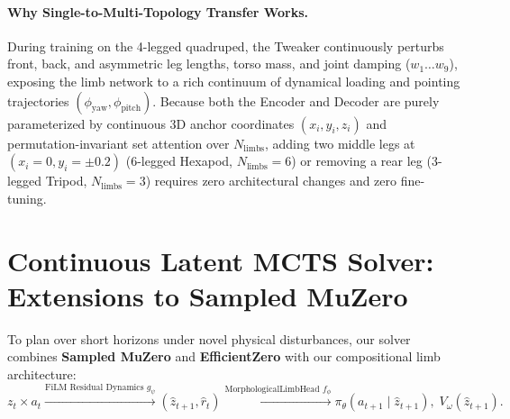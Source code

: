 \documentclass[11pt,a4paper]{article}
\begin{document}
\paragraph{Why Single-to-Multi-Topology Transfer Works.}
During training on the 4-legged quadruped, the Tweaker continuously perturbs front, back, and asymmetric leg lengths, torso mass, and joint damping ($w_1 \dots w_9$), exposing the limb network to a rich continuum of dynamical loading and pointing trajectories $(\phi_{\text{yaw}}, \phi_{\text{pitch}})$. Because both the Encoder and Decoder are purely parameterized by continuous 3D anchor coordinates $(x_i, y_i, z_i)$ and permutation-invariant set attention over $N_{\text{limbs}}$, adding two middle legs at $(x_i = 0, y_i = \pm 0.2)$ (6-legged Hexapod, $N_{\text{limbs}}=6$) or removing a rear leg (3-legged Tripod, $N_{\text{limbs}}=3$) requires zero architectural changes and zero fine-tuning.

\section{Continuous Latent MCTS Solver: Extensions to Sampled MuZero}
\label{sec:mcts}

To plan over short horizons under novel physical disturbances, our solver combines \textbf{Sampled MuZero} \cite{hubert2021learning} and \textbf{EfficientZero} \cite{ye2021mastering} with our compositional limb architecture:
\begin{equation}
    z_t \times a_t \xrightarrow{\text{FiLM Residual Dynamics } g_\psi} (\hat{z}_{t+1}, \hat{r}_t) \xrightarrow{\text{MorphologicalLimbHead } f_\phi} \pi_\theta(a_{t+1} \mid \hat{z}_{t+1}),\; V_\omega(\hat{z}_{t+1}).
\end{equation}
\end{document}
